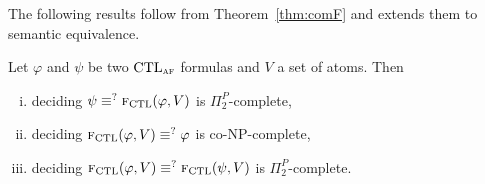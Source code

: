 \documentclass[letterpaper]{article} %
\begin{document}
%
%
%
%

The following results follow from Theorem~\ref{thm:comF} and extends them to semantic equivalence.
\begin{corollary}
Let $\varphi$ and $\psi$ be two $\textrm{CTL}_{\textsc{a} \textsc{f}}$ formulas and $V$ a set of atoms. Then
\begin{enumerate}[(i)]
  \item deciding $\psi \equiv^? {\textsc{f}_{\textrm{CTL}}}(\varphi, V)$ is $\Pi_2^P$-complete,
  \item deciding ${\textsc{f}_{\textrm{CTL}}}(\varphi, V) \equiv^? \varphi$ is co-NP-complete,
  \item deciding ${\textsc{f}_{\textrm{CTL}}}(\varphi, V) \equiv^? {\textsc{f}_{\textrm{CTL}}}(\psi, V)$ is $\Pi_2^P$-complete.
\end{enumerate}
\end{corollary}
\end{document}

